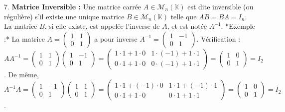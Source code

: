 \documentclass[12pt,a4paper]{report}
\begin{document}
7.  \textbf{Matrice Inversible :} Une matrice carrée $A \in \mathcal{M}_n(\mathbb{K})$ est dite inversible (ou régulière) s'il existe une unique matrice $B \in \mathcal{M}_n(\mathbb{K})$ telle que $AB = BA = I_n$. La matrice $B$, si elle existe, est appelée l'inverse de $A$, et est notée $A^{-1}$.
    *Exemple :* La matrice $A = \begin{pmatrix} 1 & 1 \\ 0 & 1 \end{pmatrix}$ a pour inverse $A^{-1} = \begin{pmatrix} 1 & -1 \\ 0 & 1 \end{pmatrix}$.
    Vérification : $A A^{-1} = \begin{pmatrix} 1 & 1 \\ 0 & 1 \end{pmatrix} \begin{pmatrix} 1 & -1 \\ 0 & 1 \end{pmatrix} = \begin{pmatrix} 1 \cdot 1 + 1 \cdot 0 & 1 \cdot (-1) + 1 \cdot 1 \\ 0 \cdot 1 + 1 \cdot 0 & 0 \cdot (-1) + 1 \cdot 1 \end{pmatrix} = \begin{pmatrix} 1 & 0 \\ 0 & 1 \end{pmatrix} = I_2$.
    De même, $A^{-1} A = \begin{pmatrix} 1 & -1 \\ 0 & 1 \end{pmatrix} \begin{pmatrix} 1 & 1 \\ 0 & 1 \end{pmatrix} = \begin{pmatrix} 1 \cdot 1 + (-1) \cdot 0 & 1 \cdot 1 + (-1) \cdot 1 \\ 0 \cdot 1 + 1 \cdot 0 & 0 \cdot 1 + 1 \cdot 1 \end{pmatrix} = \begin{pmatrix} 1 & 0 \\ 0 & 1 \end{pmatrix} = I_2$.
\end{document}
